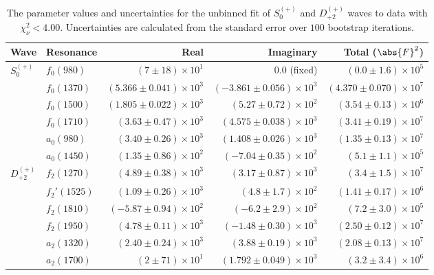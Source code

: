 \begin{table}[ht]
    \begin{center}
        \begin{tabular}{llrrr}\toprule
        Wave & Resonance & Real & Imaginary & Total ($\abs{F}^2$) \\\midrule
$S_{0}^{(+)}$ & $f_{0}(980)$ & $(7 \pm 18) \times 10^{1}$ & $0.0$ (fixed) & $(0.0 \pm 1.6) \times 10^{5}$ \\
 & $f_{0}(1370)$ & $(5.366 \pm 0.041) \times 10^{3}$ & $(-3.861 \pm 0.056) \times 10^{3}$ & $(4.370 \pm 0.070) \times 10^{7}$ \\
 & $f_{0}(1500)$ & $(1.805 \pm 0.022) \times 10^{3}$ & $(5.27 \pm 0.72) \times 10^{2}$ & $(3.54 \pm 0.13) \times 10^{6}$ \\
 & $f_{0}(1710)$ & $(3.63 \pm 0.47) \times 10^{3}$ & $(4.575 \pm 0.038) \times 10^{3}$ & $(3.41 \pm 0.19) \times 10^{7}$ \\
 & $a_{0}(980)$ & $(3.40 \pm 0.26) \times 10^{3}$ & $(1.408 \pm 0.026) \times 10^{3}$ & $(1.35 \pm 0.13) \times 10^{7}$ \\
 & $a_{0}(1450)$ & $(1.35 \pm 0.86) \times 10^{2}$ & $(-7.04 \pm 0.35) \times 10^{2}$ & $(5.1 \pm 1.1) \times 10^{5}$ \\
$D_{+2}^{(+)}$ & $f_{2}(1270)$ & $(4.89 \pm 0.38) \times 10^{3}$ & $(3.17 \pm 0.87) \times 10^{3}$ & $(3.4 \pm 1.5) \times 10^{7}$ \\
 & $f_{2}'(1525)$ & $(1.09 \pm 0.26) \times 10^{3}$ & $(4.8 \pm 1.7) \times 10^{2}$ & $(1.41 \pm 0.17) \times 10^{6}$ \\
 & $f_{2}(1810)$ & $(-5.87 \pm 0.94) \times 10^{2}$ & $(-6.2 \pm 2.9) \times 10^{2}$ & $(7.2 \pm 3.0) \times 10^{5}$ \\
 & $f_{2}(1950)$ & $(4.78 \pm 0.11) \times 10^{3}$ & $(-1.48 \pm 0.30) \times 10^{3}$ & $(2.50 \pm 0.12) \times 10^{7}$ \\
 & $a_{2}(1320)$ & $(2.40 \pm 0.24) \times 10^{3}$ & $(3.88 \pm 0.19) \times 10^{3}$ & $(2.08 \pm 0.13) \times 10^{7}$ \\
 & $a_{2}(1700)$ & $(2 \pm 71) \times 10^{1}$ & $(1.792 \pm 0.049) \times 10^{3}$ & $(3.2 \pm 3.4) \times 10^{6}$ \\\bottomrule
        \end{tabular}
    \caption{The parameter values and uncertainties for the unbinned fit of $S_{0}^{(+)}$ and $D_{+2}^{(+)}$ waves to data with $\chi^2_\nu < 4.00$. Uncertainties are calculated from the standard error over $100$ bootstrap iterations.}\label{tab:unbinned-fit-chisqdof-4.0-Sp0p-Dp2p}
    \end{center}
\end{table}
